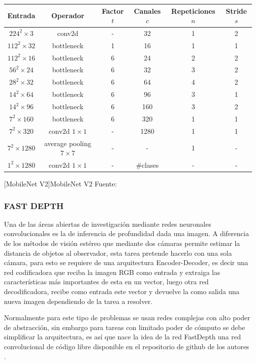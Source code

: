         	\begin{center}
        		\footnotesize
        		\begin{tabular}{|c|c|c|c|c|c|}
        			\hline
					Entrada & Operador & Factor $t$ & Canales $c$ & Repeticiones $n$ & Stride $s$\\
					\hline
					$224^2\times3$ & conv2d & - & 32 & 1 & 2\\
					$112^2\times32$ & bottleneck & 1 & 16 & 1 & 1\\
					$112^2\times16$ & bottleneck & 6 & 24 & 2 & 2\\
					$56^2\times24$ & bottleneck & 6 & 32 & 3 & 2\\
					$28^2\times32$ & bottleneck & 6 & 64 & 4 & 2\\
					$14^2\times64$ & bottleneck & 6 & 96 & 3 & 1\\
					$14^2\times96$ & bottleneck & 6 & 160 & 3 & 2\\
					$7^2\times160$ & bottleneck & 6 & 320 & 1 & 1\\
					$7^2\times320$ & conv2d $1\times1$ & - & 1280 & 1 & 1\\
					$7^2\times1280$ & average pooling $7\times7$ & - & - & 1 & -\\
					$1^2\times1280$ & conv2d $1\times1$ & - & \#clases & - & -\\
        			\hline
        		\end{tabular}
        		[MobileNet V2]{MobileNet V2 Fuente:\citep{8578572}}\label{mobilenet2}
        	\end{center}
        \subsubsection{FAST DEPTH}
        	Una de las áreas abiertas de investigación mediante redes neuronales convolucionales es la de inferencia de profundidad dada una imagen. A diferencia de los métodos de visión estéreo que mediante dos cámaras permite estimar la distancia de objetos al observador, esta tarea pretende hacerlo con una sola cámara, para esto se requiere de una arquitectura Encoder-Decoder, es decir una red codificadora que reciba la imagen RGB como entrada y extraiga las características más importantes de esta en un vector, luego otra red decodificadora, recibe como entrada este vector y devuelve la como salida una nueva imagen dependiendo de la tarea a resolver.
        	
        	Normalmente para este tipo de problemas se usan redes complejas con alto poder de abstracción, sin embargo para tareas con limitado poder de cómputo se debe simplificar la arquitectura, es así que nace la idea de la red FastDepth una red convolucional de código libre disponible en el repositorio de github de los autores \citep{icra_2019_fastdepth}.
        	
